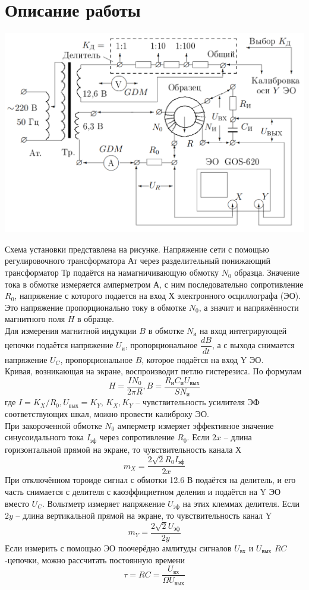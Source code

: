 \documentclass[a4paper,12pt]{article}
\begin{document}
\section*{Описание работы} 
\begin{center}
\includegraphics[scale=0.5]{1.png}
\end{center}
Схема установки представлена на рисунке. Напряжение сети с помощью регулировочного трансформатора Ат через разделительный понижающий трансформатор Тр подаётся на намагничивающую обмотку $N_0$ образца. Значение тока в обмотке измеряется амперметром А, с ним последовательно сопротивление $R_0$, напряжение с которого подается на вход Х электронного осциллографа (ЭО). Это напряжение пропорционально току в обмотке $N_0$, а значит и напряжённости магнитного поля $H$ в образце.\\
Для измерения магнитной индукции $B$ в обмотке $N_\text{и}$ на вход интегрирующей цепочки подаётся напряжение $U_\text{и}$, пропорциональное $\dfrac{dB}{dt}$, а с выхода снимается напряжение $U_C$, пропорциональное $B$, которое подаётся на вход Y ЭО.\\
Кривая, возникающая на экране, воспроизводит петлю гистерезиса. По формулам 
$$
H = \dfrac{IN_0}{2\pi R}, B = \dfrac{R_\text{и} C_\text{и}U_\text{вых}}{SN_\text{и}}
$$
где $I = K_X/R_0, U_\text{вых} = K_Y$, $K_X, K_Y$ -- чувствительность усилителя ЭФ соответствующих шкал, можно провести калиброку ЭО.\\
При закороченной обмотке $N_0$ амперметр измеряет эффективное значение синусоидального тока $I_\text{эф}$ через сопротивление $R_0$. Если $2x$ -- длина горизонтальной прямой на экране, то чувствительность канала Х
$$
m_X = \dfrac{2\sqrt{2}R_0I_\text{эф}}{2x}
$$
При отключённом тороиде сигнал с обмотки 12.6 В подаётся на делитель, и его часть снимается с делителя с каоэффициетном деления и подаётся на Y ЭО вместо $U_C$. Вольтметр измеряет напряжение $U_\text{эф}$ на этих клеммах делителя. Если $2y$ -- длина вертикальной прямой на экране, то чувствительность канал Y
$$
m_Y = \dfrac{2\sqrt{2}U_\text{эф}}{2y}
$$
Если измерить с помощью ЭО поочерёдно амлитуды сигналов $U_\text{вх}$ и $U_\text{вых}$ $RC$-цепочки, можно рассчитать постоянную времени 
$$
\tau = RC = \dfrac{U_\text{вх}}{\Omega U_\text{вых}} 
$$
\end{document}
